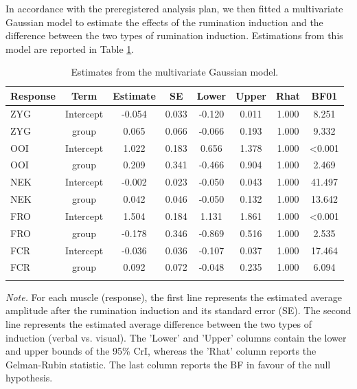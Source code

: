 \documentclass[a4paper,12pt,twoside,openright,oldfontcommands]{memoir}
\begin{document}
In accordance with the preregistered analysis plan, we then fitted a multivariate Gaussian model to estimate the effects of the rumination induction and the difference between the two types of rumination induction. Estimations from this model are reported in Table \ref{tab:outputbmod1}.

\begin{table}[H]
\begin{center}
\begin{threeparttable}
\caption{\label{tab:outputbmod1}Estimates from the multivariate Gaussian model.}
\small{
\begin{tabular}{lccccccc}
\toprule
Response & \multicolumn{1}{c}{Term} & \multicolumn{1}{c}{Estimate} & \multicolumn{1}{c}{SE} & \multicolumn{1}{c}{Lower} & \multicolumn{1}{c}{Upper} & \multicolumn{1}{c}{Rhat} & \multicolumn{1}{c}{BF01}\\
\midrule
ZYG & Intercept & -0.054 & 0.033 & -0.120 & 0.011 & 1.000 & 8.251\\
ZYG & group & 0.065 & 0.066 & -0.066 & 0.193 & 1.000 & 9.332\\
OOI & Intercept & 1.022 & 0.183 & 0.656 & 1.378 & 1.000 & <0.001\\
OOI & group & 0.209 & 0.341 & -0.466 & 0.904 & 1.000 & 2.469\\
NEK & Intercept & -0.002 & 0.023 & -0.050 & 0.043 & 1.000 & 41.497\\
NEK & group & 0.042 & 0.046 & -0.050 & 0.132 & 1.000 & 13.642\\
FRO & Intercept & 1.504 & 0.184 & 1.131 & 1.861 & 1.000 & <0.001\\
FRO & group & -0.178 & 0.346 & -0.869 & 0.516 & 1.000 & 2.535\\
FCR & Intercept & -0.036 & 0.036 & -0.107 & 0.037 & 1.000 & 17.464\\
FCR & group & 0.092 & 0.072 & -0.048 & 0.235 & 1.000 & 6.094\\
\bottomrule
\addlinespace
\end{tabular}
}
\begin{tablenotes}[para]
\textit{Note.} For each muscle (response), the first line represents the estimated average
amplitude after the rumination induction and its standard error (SE). The second line
represents the estimated average difference between the two types of induction (verbal vs. visual). The 'Lower' and 'Upper' columns contain the lower and upper bounds of the 95\% CrI, whereas the 'Rhat' column reports the Gelman-Rubin statistic. The last column reports the BF in favour of the null hypothesis.
\end{tablenotes}
\end{threeparttable}
\end{center}
\end{table}
\end{document}
